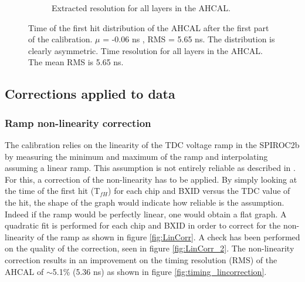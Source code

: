 \begin{figure}[t]
\begin{subfigure}[t]{0.45\textwidth}
		\caption{Extracted resolution for all layers in the AHCAL.}\label{fig:reso_nocorrection}
	\end{subfigure}
	\caption{ Time of the first hit distribution of the AHCAL after the first part of the calibration. $\mu$ = -0.06 ns , RMS = 5.65 ns. The distribution is clearly asymmetric.  Time resolution for all layers in the AHCAL. The mean RMS is 5.65 ns.}
\end{figure}

\subsection{Corrections applied to data}
\subsubsection{Ramp non-linearity correction}
\label{subsec:lin_corr}

The calibration relies on the linearity of the TDC voltage ramp in the SPIROC2b by measuring the minimum and maximum of the ramp and interpolating assuming a linear ramp. This assumption is not entirely reliable as described in \cite{OskarSSP, EldwanSSP}. For this, a correction of the non-linearity has to be applied. By simply looking at the time of the first hit (T$_{fH}$) for each chip and BXID versus the TDC value of the hit, the shape of the graph would indicate how reliable is the assumption. Indeed if the ramp would be perfectly linear, one would obtain a flat graph. A quadratic fit is performed for each chip and BXID in order to correct for the non-linearity of the ramp as shown in figure \ref{fig:LinCorr}. A check has been performed on the quality of the correction, seen in figure \ref{fig:LinCorr_2}. The non-linearity correction results in an improvement on the timing resolution (RMS) of the AHCAL of $\sim$5.1\% (5.36 ns) as shown in figure \ref{fig:timing_lincorrection}.

